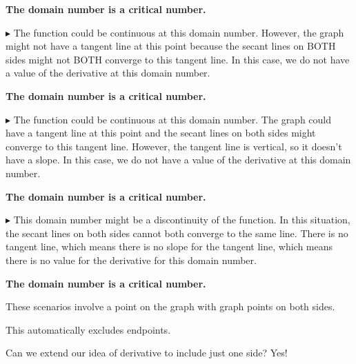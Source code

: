 \documentclass{ximera}
\begin{document}
\begin{center}
\textbf{\textcolor{blue!55!black}{The domain number is a critical number.}}
\end{center}


\textbf{\textcolor{blue!55!black}{$\blacktriangleright$}}  The function could be continuous at this domain number.  However, the graph might not have a tangent line at this point because the secant lines on BOTH sides might not BOTH converge to this tangent line.  In this case, we do not have a value of the derivative at this domain number. 

\begin{center}
\textbf{\textcolor{blue!55!black}{The domain number is a critical number.}}
\end{center}

\textbf{\textcolor{blue!55!black}{$\blacktriangleright$}}  The function could be continuous at this domain number. The graph could have a tangent line at this point and the secant lines on both sides might converge to this tangent line.  However, the tangent line is vertical, so it doesn't have a slope. In this case, we do not have a value of the derivative at this domain number. 

\begin{center}
\textbf{\textcolor{blue!55!black}{The domain number is a critical number.}}
\end{center}

\textbf{\textcolor{blue!55!black}{$\blacktriangleright$}}  This domain number might be a discontinuity of the function. In this situation, the secant lines on both sides cannot both converge to the same line.  There is no tangent line, which means there is no slope for the tangent line, which means there is no value for the derivative for this domain number. 

\begin{center}
\textbf{\textcolor{blue!55!black}{The domain number is a critical number.}}
\end{center}





These scenarios involve a point on the graph with graph points on both sides.

This automatically excludes endpoints.


Can we extend our idea of derivative to include just one side? Yes!
\end{document}
